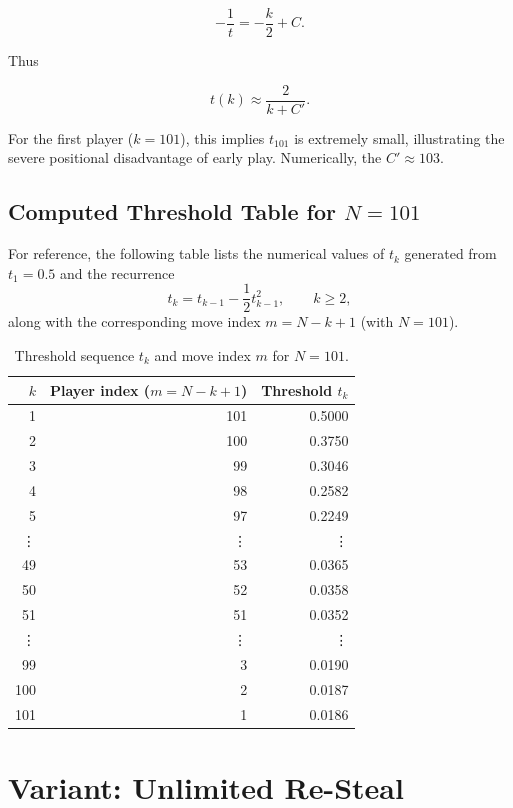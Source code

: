 \documentclass{article}
\begin{document}
\[
-\frac{1}{t} = -\frac{k}{2} + C.
\]

Thus

\[
t(k) \approx \frac{2}{k+C'}.
\]

For the first player ($k=101$), this implies $t_{101}$ is extremely small, illustrating the severe positional disadvantage of early play.
Numerically, the $C' \approx 103$.

\subsection{Computed Threshold Table for $N=101$}

For reference, the following table lists the numerical values of $t_k$ generated from $t_1=0.5$ and the recurrence
\[
t_k = t_{k-1} - \frac{1}{2}t_{k-1}^2,\qquad k\ge 2,
\]
along with the corresponding move index $m = N-k+1$ (with $N=101$).

\begingroup
\small
\setlength{\tabcolsep}{7pt}
\begin{longtable}{rrr}
\caption{Threshold sequence $t_k$ and move index $m$ for $N=101$.}\label{tab:thresholds-101}\\
\toprule
$k$ & Player index ($m=N-k+1$) & Threshold $t_k$ \\
\midrule
\endfirsthead

\endfoot

\bottomrule
\endlastfoot

1 & 101 & 0.5000 \\
2 & 100 & 0.3750 \\
3 & 99 & 0.3046\\
4 & 98 & 0.2582\\
5 & 97 & 0.2249\\
\vdots & \vdots & \vdots \\
49 & 53 & 0.0365 \\
50 & 52 & 0.0358 \\
51 & 51 & 0.0352 \\
\vdots & \vdots & \vdots \\
99 & 3 & 0.0190\\
100 & 2 & 0.0187 \\
101 & 1 & 0.0186 \\
\end{longtable}
\endgroup



\section{Variant: Unlimited Re-Steal}
\end{document}
